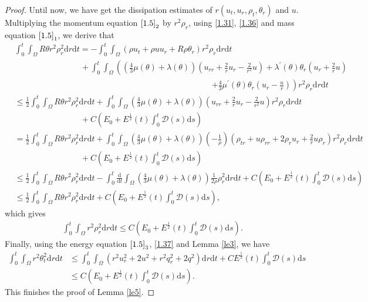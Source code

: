 \documentclass[11pt,reqno]{amsart}
\numberwithin{equation}{section}
\newcommand{\dif}{\mathrm{d}}
\newcommand{\intx}{\int_0^t \int_{\Omega} }
\begin{document}
\begin{proof}
Until now, we have get the dissipation estimates of $r(u_t, u_r, \rho_t, \theta_r)$ and $u$.
Multiplying the momentum equation $\eqref{1.5}_2$ by $r^2 \rho_r$,  using \eqref{1.31}, \eqref{1.36} and mass equation $\eqref{1.5}_1$, we derive that{\small
\begin{align*}
&\intx R \theta r^2 \rho_r^2 \dif r \dif t=-\intx  \left( \rho u_t +\rho u u_r+R \rho \theta_r\right)r^2 \rho_r \dif r \dif t\\
&\qquad\qquad\qquad\qquad+\intx \left(\left(\frac{4}{3} \mu(\theta)+\lambda(\theta)\right)\left(u_{rr}+\frac{2}{r}u_r-\frac{2}{r^2} u\right)+\lambda^\prime(\theta)\theta_r\left(u_r+\frac{2}{r}u\right)\right.\\
&\qquad\qquad\qquad\qquad\qquad\qquad\qquad\qquad\qquad\qquad\qquad\qquad\left.+\frac{4}{3}\mu^\prime(\theta) \theta_r\left(u_r-\frac{u}{r}\right)\right) r^2 \rho_r \dif r \dif t\\
&\le \frac{1}{2}\intx  R\theta r^2 \rho_r^2 \dif r \dif t+ \intx \left(\frac{4}{3}\mu(\theta)+\lambda(\theta)\right)\left(u_{rr}+\frac{2}{r}u_r-\frac{2}{r^2} u\right) r^2 \rho_r \dif r \dif t\\
&\qquad\qquad\qquad\qquad +C(E_0+E^\frac{1}{2}(t) \int_0^t  \mathcal D(s)\dif s)\\
&= \frac{1}{2}\intx  R\theta r^2 \rho_r^2 \dif r \dif t+ \intx \left(\frac{4}{3}\mu(\theta)+\lambda(\theta)\right)\left(-\frac{1}{\rho}\right) \left( \rho_{tr}+u\rho_{rr}+2 \rho_r u_r+\frac{2}{r} u\rho_r\right) r^2 \rho_r \dif r \dif t \\ &\qquad\qquad\qquad\qquad+C(E_0+E^\frac{1}{2}(t) \int_0^t  \mathcal D(s)\dif s)\\
&\le \frac{1}{2}\intx  R\theta r^2 \rho_r^2 \dif r \dif t-\int_0^t \frac{\dif}{\dif t}\int_{\Omega}  \left(\frac{4}{3}\mu(\theta)+\lambda(\theta)\right)\frac{1}{2\rho} \rho_r^2 \dif r\dif t +C(E_0+E^\frac{1}{2}(t) \int_0^t  \mathcal D(s)\dif s)\\
&\le \frac{1}{2}\intx  R\theta r^2 \rho_r^2 \dif r \dif t+C(E_0+E^\frac{1}{2}(t) \int_0^t  \mathcal D(s)\dif s),
\end{align*}}
which gives
\begin{align}
\intx r^2 \rho_r^2 \dif r \dif t \le  C(E_0+E^\frac{1}{2}(t) \int_0^t  \mathcal D(s)\dif s). \label{1.38}
\end{align}
Finally, using the  energy equation $\eqref{1.5}_3$, \eqref{1.37} and Lemma \ref{le3}, we have
\begin{align}
\intx r^2 \theta_t^2 \dif r \dif t &\le \intx (r^2u_r^2+2u^2+r^2 q_r^2+2 q^2)\dif r \dif t+C E^\frac{1}{2}(t) \int_0^t  \mathcal D(s)\dif s \nonumber\\
&\le C(E_0+E^\frac{1}{2}(t) \int_0^t  \mathcal D(s)\dif s). \label{1.39}
\end{align}
 This finishes the proof of Lemma \ref{le5}.
\end{proof}
\end{document}

